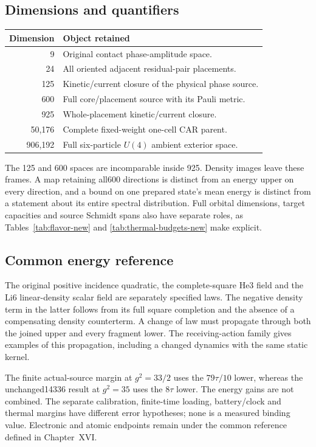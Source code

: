 \subsection{Dimensions and quantifiers}

\begin{center}\small
\begin{tabular}{rp{2.35in}}\toprule
Dimension & Object retained\\\midrule
9 & Original contact phase-amplitude space.\\
24 & All oriented adjacent residual-pair placements.\\
125 & Kinetic/current closure of the physical phase source.\\
600 & Full core/placement source with its Pauli metric.\\
925 & Whole-placement kinetic/current closure.\\
50,176 & Complete fixed-weight one-cell CAR parent.\\
906,192 & Full six-particle $U(4)$ ambient exterior space.\\\bottomrule
\end{tabular}
\end{center}

The 125 and 600 spaces are incomparable inside 925. Density images leave
these frames. A map retaining all600 directions is distinct from an energy
upper on every direction, and a bound on one prepared state's mean energy
is distinct from a statement about its entire spectral distribution.
Full orbital dimensions, target capacities and source Schmidt spans also
have separate roles, as Tables~\ref{tab:flavor-new} and
\ref{tab:thermal-budgets-new} make explicit.

\subsection{Common energy reference}

The original positive incidence quadratic, the complete-square He3 field
and the Li6 linear-density scalar field are separately specified laws.
The negative density term in the latter follows from its full square
completion and the absence of a compensating density counterterm. A change
of law must propagate through both the joined upper and every fragment
lower. The receiving-action family gives examples of this propagation,
including a changed dynamics with the same static kernel.

The finite actual-source margin at $g^2=33/2$ uses the $79\tau/10$ lower,
whereas the unchanged14336 result at $g^2=35$ uses the $8\tau$ lower. The
energy gains are not combined. The separate calibration, finite-time
loading, battery/clock and thermal margins have different error hypotheses;
none is a measured binding value. Electronic and atomic endpoints remain
under the common reference defined in Chapter~XVI.

